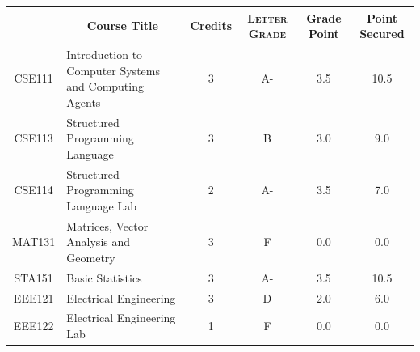 \documentclass[11pt]{article}
\newcommand*{\numtwo}[1]{\pgfmathprintnumber[
                    fixed, precision=2, fixed zerofill=true]{#1}}
\begin{document}
                \begin{center}
                    \renewcommand{\arraystretch}{1.08}
                    
                \begin{tabular}{|c|l|c|>{\scshape}c|c|c|}
                \hline  \rule[-1ex]{0pt}{3.5ex} {\centering{\bf Course Code}} &  \multicolumn{1}{c|}{\textbf{Course Title}}  & {\bf Credits} & {\bf Letter Grade} & {\bf Grade Point} & {\bf Point Secured}  \\ 
                \hline   CSE111 &  Introduction to Computer Systems and Computing Agents		 & 3 & A- & 3.5 & 10.5 \\ %
                \hline   CSE113 &  Structured Programming Language		 & 3 & B & 3.0 & 9.0 \\ %
                \hline   CSE114 &  Structured Programming Language Lab		 & 2 & A- & 3.5 & 7.0 \\ %
                \hline   MAT131 &  Matrices, Vector Analysis and Geometry		 & 3 & F & 0.0 & 0.0 \\ %
                \hline   STA151 &  Basic Statistics		 & 3 & A- & 3.5 & 10.5 \\ %
                \hline   EEE121 &  Electrical Engineering		 & 3 & D & 2.0 & 6.0 \\ %
                \hline   EEE122 &  Electrical Engineering Lab		 & 1 & F & 0.0 & 0.0 \\ %

\hline                %
                \end{tabular}
                \end{center}
                \renewcommand{\arraystretch}{1.03}
\end{document}
